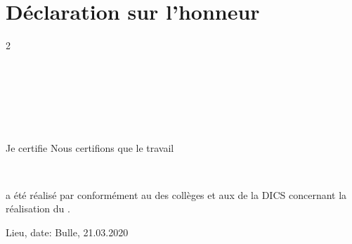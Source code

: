 \chapter*{Déclaration sur l'honneur}


\begin{multicols}{2}
\theauthor\\
\theadress\\
\lieu\\
\columnbreak

\theauthorB\ \\
\theadressB\ \\
\lieuB\
\end{multicols}

\ifthenelse{\equal{\theauthorB}{}}
{Je certifie}
{Nous certifions}
que le travail

\begin{center}
{\Large\sf \worktitle}\\
{\large\sf \worksubtitle}
\end{center}


a été réalisé par
conformément au  des collèges et aux  de la DICS concernant la réalisation du \worktype.

\vspace{4cm}
Lieu, date: Bulle, 21.03.2020

